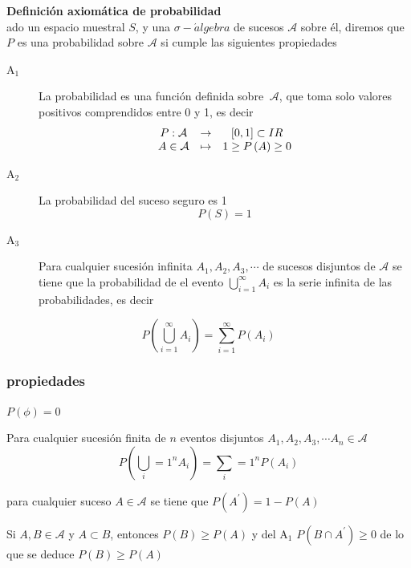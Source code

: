 \documentclass{article}%
\begin{document}
\begin{definition}
\textbf{Definici\'{o}n axiom\'{a}tica de probabilidad}\\[D]ado un espacio
muestral $S$, y una $\sigma-\acute{a}lgebra$ de sucesos $\mathcal{A}$ sobre
\'{e}l, diremos que $P$ es una probabilidad sobre $\mathcal{A}$ si cumple las
siguientes propiedades
\begin{description}
\item[A$_{1}$] La probabilidad es una funci\'{o}n definida sobre
$\ \mathcal{A}$, que toma solo valores positivos comprendidos entre 0 y 1, es
decir \[
\begin{array}
[c]{ccc}
P:\mathcal{A} & \rightarrow& [0,1]\subset IR\\ A\in\mathcal{A} & \mapsto&
1\geq P\left(   A\right)   \geq0
\end{array}
\]   \item[A$_{2}$] La probabilidad del suceso seguro es 1 \[ P\left(
S\right)   =1 \]   \item[A$_{3}$] Para cualquier sucesi\'{o}n infinita
$A_{1},A_{2},A_{3},\cdots$ de sucesos disjuntos de $\mathcal{A}$ se tiene que
la probabilidad de el evento $\bigcup_{i=1}^{\infty}A_{i}$ es la serie
infinita de las probabilidades, es decir
\end{description}
\end{definition}%

\[
P\left(  \bigcup_{i=1}^{\infty}A_{i}\right)  =\sum_{i=1}^{\infty}P\left(
A_{i}\right)
\]

\subsubsection{propiedades}

$P\left(  \phi\right)  =0$%

\begin{theorem}
Para cualquier sucesi\'{o}n finita de $n$ eventos disjuntos $A_{1},A_{2}
,A_{3},\cdots A_{n}\in\mathcal{A}$ \[ P\left(   \bigcup_i=1^nA_i\right)
=\sum_i=1^nP\left(   A_i\right)  \]
\end{theorem} %

\begin{theorem}
para cualquier suceso $A\in\mathcal{A}$ se tiene que $P\left(   A^{\prime
}\right)   =1-P\left(   A\right)   $
\end{theorem} %

\begin{theorem}
Si $A,B\in\mathcal{A}$ y $A\subset B$, entonces $P\left(   B\right)   \geq
P\left(   A\right)   $ y del A$_{1}$ $P\left(   B\cap A^{\prime}\right)
\geq0$ de lo que se deduce $P\left(   B\right)   \geq P\left(   A\right)   $
\end{theorem} %
\end{document}
